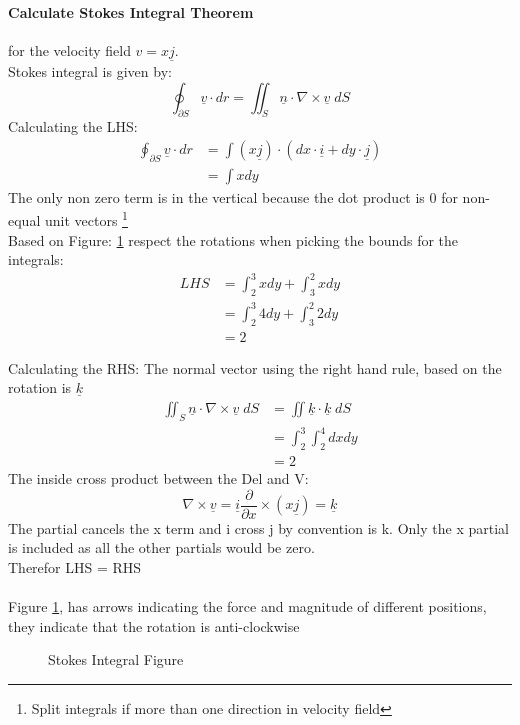 \documentclass[../main.tex]{subfiles}
\newcommand{\un}[1]{\underline{#1}}
\newcommand{\partFrac}[2]{\frac{\partial #1}{\partial #2}}
\begin{document}
	\paragraph{Calculate Stokes Integral Theorem} for the velocity field $v=x \un{j}$.
		\\ Stokes integral is given by:
		\begin{equation*}
			\oint_{\partial S} \un{v}\cdot dr = \iint_S \un{n} \cdot \nabla \times \un{v} \; dS
		\end{equation*}
		Calculating the LHS:
		\begin{align*}
			\oint_{\partial S} \un{v}\cdot dr &= \int (x\un{j}) \cdot (dx \cdot \un{i} + dy \cdot \un{j}) \\
											  &= \int x dy
		\end{align*}
		The only non zero term is in the vertical because the dot product is 0 for non-equal unit vectors 
		\footnote{Split integrals if more than one direction in velocity field}
		\\ Based on Figure: \ref{fg:2} respect the rotations when picking the bounds for the integrals:
		\begin{align*}
			LHS &= \int_2^3 x dy + \int_3^2 x dy \\
				&= \int_2^3 4 dy + \int_3^2 2 dy \\
				&= 2
		\end{align*}

		Calculating the RHS:
		The normal vector using the right hand rule, based on the rotation is $\un{k}$
		\begin{align*}
			\iint_S \un{n} \cdot \nabla \times \un{v} \; dS &= \iint \un{k} \cdot \un{k} \; dS \\
															&= \int_2^3 \int_2^4 dxdy \\
															&= 2
		\end{align*}
		The inside cross product between the Del and V:
		\begin{equation*}
			\nabla \times \un{v} = \un{i} \partFrac{}{x} \times (x \un{j}) = \un{k}
		\end{equation*}
		The partial cancels the x term and i cross j by convention is k. Only the x partial is included as all the 
		other partials would be zero. \\
		Therefor LHS = RHS \\
		\\
		Figure \ref{fg:2}, has arrows indicating the force and magnitude of different positions, they indicate that the rotation is
		anti-clockwise
		\begin{figure}[ht]
			\centering
			\caption{Stokes Integral Figure}
			\label{fg:2}
		\end{figure}
\end{document}
